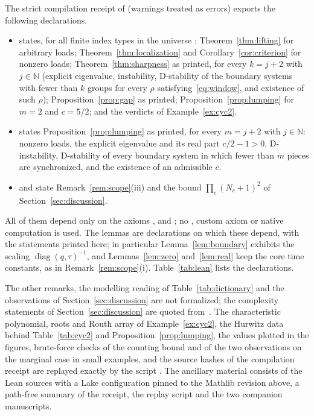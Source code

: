\documentclass[11pt,a4paper]{article}
\theoremstyle{plain}
\theoremstyle{definition}
\theoremstyle{remark}
\newcommand{\diag}{\operatorname{diag}}
\begin{document}
The strict compilation receipt of  (warnings treated as errors) exports the
following declarations.
\begin{itemize}
  \item {} states, for all finite index types in the universe
    : Theorem~\ref{thm:lifting} for arbitrary loads;
    Theorem~\ref{thm:localization} and Corollary~\ref{cor:criterion} for nonzero loads;
    Theorem~\ref{thm:sharpness} as printed, for every $k=j+2$ with $j\in\mathbb{N}$ (explicit
    eigenvalue, instability, D-stability of the boundary systems with fewer than $k$ groups
    for every $\rho$ satisfying~\eqref{eq:window}, and existence of such $\rho$);
    Proposition~\ref{prop:gap} as printed; Proposition~\ref{prop:lumping} for $m=2$ and
    $c=5/2$; and the verdicts of Example~\ref{ex:cyc2}.
  \item {} states Proposition~\ref{prop:lumping} as printed, for every
    $m=j+2$ with $j\in\mathbb{N}$: nonzero loads, the explicit eigenvalue and its real part
    $c/2-1>0$, D-instability, D-stability of every boundary system in which fewer than $m$
    pieces are synchronized, and the existence of an admissible $c$.
  \item {} and  state
    Remark~\ref{rem:scope}(iii) and the bound $\prod_c(N_c+1)^2$ of
    Section~\ref{sec:discussion}.
\end{itemize}
All of them depend only on the axioms ,  and
; no , custom axiom or native computation is used. The lemmas are
declarations on which these depend, with the statements printed here; in particular
Lemma~\ref{lem:boundary} exhibits the scaling $\diag(q,\tau)^{-1}$, and
Lemmas~\ref{lem:zero} and~\ref{lem:real} keep the core time constants, as in
Remark~\ref{rem:scope}(i). Table~\ref{tab:lean} lists the declarations.

The other remarks, the modelling reading of Table~\ref{tab:dictionary} and the observations of
Section~\ref{sec:discussion} are not formalized; the complexity statements of
Section~\ref{sec:discussion} are quoted from~\cite{companionHard2026}. The characteristic
polynomial, roots and Routh array of Example~\ref{ex:cyc2}, the Hurwitz data behind
Table~\ref{tab:cyc2} and Proposition~\ref{prop:lumping}, the values plotted in the figures,
brute-force checks of the counting bound and of the two observations on the marginal case in
small examples, and the source hashes of the compilation receipt are replayed exactly by the
script . The ancillary material consists of the Lean sources with a Lake
configuration pinned to the Mathlib revision above, a path-free summary of the receipt, the
replay script and the two companion manuscripts.
\end{document}
